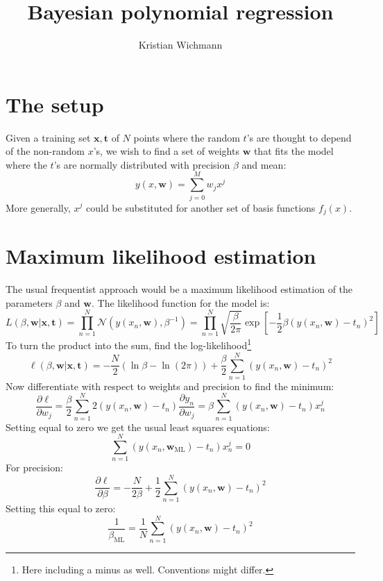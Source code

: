 \documentclass[12pt, a4paper]{article}
\title{Bayesian polynomial regression}
\author{Kristian Wichmann}
\numberwithin{equation}{section}
\begin{document}
\maketitle

\section{The setup}
Given a training set $\mathbf{x}, \mathbf{t}$ of $N$ points where the random $t$'s are thought to depend of the non-random $x$'s, we wish to find a set of weights $\mathbf{w}$ that fits the model where the $t$'s are normally distributed with precision $\beta$ and mean:
\begin{equation}
y(x,\mathbf{w})=\sum_{j=0}^M w_j x^j
\end{equation}
More generally, $x^j$ could be substituted for another set of basis functions $f_j(x)$.

\section{Maximum likelihood estimation}
The usual frequentist approach would be a maximum likelihood estimation of the parameters $\beta$ and $\mathbf{w}$. The likelihood function for the model is:
\begin{equation}
L(\beta,\mathbf{w}|\mathbf{x}, \mathbf{t})=\prod_{n=1}^N\mathcal{N}(y(x_n,\mathbf{w}),\beta^{-1})=\prod_{n=1}^N\sqrt{\frac{\beta}{2\pi}}\exp\left[-\frac{1}{2}\beta(y(x_n,\mathbf{w})-t_n)^2\right]
\label{likelihood}
\end{equation}
To turn the product into the sum, find the log-likelihood\footnote{Here including a minus as well. Conventions might differ.}
\begin{equation}
\ell(\beta,\mathbf{w}|\mathbf{x}, \mathbf{t})=-\frac{N}{2}(\ln\beta-\ln(2\pi))+\frac{\beta}{2}\sum_{n=1}^N(y(x_n,\mathbf{w})-t_n)^2
\end{equation}
Now differentiate with respect to weights and precision to find the minimum:
\begin{equation}
\frac{\partial\ell}{\partial w_j}=\frac{\beta}{2}\sum_{n=1}^N 2(y(x_n,\mathbf{w})-t_n)\frac{\partial y_n}{\partial w_j}=\beta\sum_{n=1}^N(y(x_n,\mathbf{w})-t_n)x_n^j
\end{equation}
Setting equal to zero we get the usual least squares equations:
\begin{equation}
\sum_{n=1}^N(y(x_n,\mathbf{w}_{\textrm{ML}})-t_n)x_n^j=0
\end{equation}
For precision:
\begin{equation}
\frac{\partial\ell}{\partial\beta}=-\frac{N}{2\beta}+\frac{1}{2}\sum_{n=1}^N(y(x_n,\mathbf{w})-t_n)^2
\end{equation}
Setting this equal to zero:
\begin{equation}
\frac{1}{\beta_{\textrm{ML}}}=\frac{1}{N}\sum_{n=1}^N(y(x_n,\mathbf{w})-t_n)^2
\end{equation}
\end{document}

